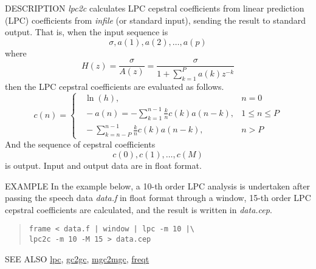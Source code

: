 \begin{synopsis}
 \item[lpc2c] [ --m $M_1$ ] [ --M $M_2$ ] [ {\em infile} ]
\end{synopsis}
\begin{qsection}{DESCRIPTION}
{\em lpc2c} calculates LPC cepstral coefficients 
from linear prediction (LPC) coefficients 
from {\em infile} (or standard input), 
sending the result to standard output.
That is, when the input sequence is 
\begin{displaymath} 
   \sigma, a(1), a(2), \dots, a(p) 
\end{displaymath}
where
\begin{displaymath}
   H(z)=\frac{\sigma}{A(z)}=\frac{\sigma}{\displaystyle 1+\sum_{k=1}^P a(k) z^{-k}}
\end{displaymath}
then the LPC cepstral coefficients are evaluated as follows.
\begin{displaymath}
   c(n) = \begin{cases}
 \;\; \ln(h),&n=0\\
 \;\; \displaystyle -a(n)=-\sum^{n-1}_{k=1}\frac{k}{n}c(k) a(n-k),&1\leq n\leq P\\ 
 \;\; \displaystyle -\sum_{k=n-P}^{n-1}\frac{k}{n}c(k) a(n-k),& n>P
\end{cases}
\end{displaymath}
And the sequence of cepstral coefficients
\begin{displaymath}
   c(0), c(1), \dots, c(M)
\end{displaymath}
is output.
Input and output data are in float format.
\end{qsection}

\begin{options}
\end{options}

\begin{qsection}{EXAMPLE}
In the example below, a 10-th order LPC analysis is undertaken after
passing the speech data {\em data.f} in float format through a window,
15-th order LPC cepstral coefficients are calculated,
and the result is written in {\em data.cep}.
\begin{quote}
 \verb!frame < data.f | window | lpc -m 10 |\!\\
 \verb!lpc2c -m 10 -M 15 > data.cep!
\end{quote}
\end{qsection}

\begin{qsection}{SEE ALSO}
\hyperlink{lpc}{lpc},
\hyperlink{gc2gc}{gc2gc},
\hyperlink{mgc2mgc}{mgc2mgc},
\hyperlink{freqt}{freqt}
\end{qsection}
